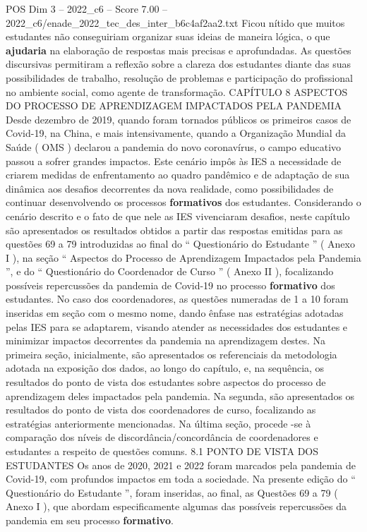 \begin{textsample}{POS Dim 3 – 2022\_c6 – Score 7.00 – 2022\_c6/enade\_2022\_tec\_des\_inter\_b6c4af2aa2.txt}
Ficou nítido que muitos estudantes não conseguiriam organizar suas ideias de maneira lógica, o que \textbf{ajudaria} na elaboração de respostas mais precisas e aprofundadas.
As questões discursivas permitiram a reflexão sobre a clareza dos estudantes diante das suas possibilidades de trabalho, resolução de problemas e participação do profissional no ambiente social, como agente de transformação.
CAPÍTULO 8 ASPECTOS DO PROCESSO DE APRENDIZAGEM IMPACTADOS PELA PANDEMIA Desde dezembro de 2019, quando foram tornados públicos os primeiros casos de Covid-19, na China, e mais intensivamente, quando a Organização Mundial da Saúde ( OMS ) declarou a pandemia do novo coronavírus, o campo educativo passou a sofrer grandes impactos.
Este cenário impôs às IES a necessidade de criarem medidas de enfrentamento ao quadro pandêmico e de adaptação de sua dinâmica aos desafios decorrentes da nova realidade, como possibilidades de continuar desenvolvendo os processos \textbf{formativos} dos estudantes.
Considerando o cenário descrito e o fato de que nele as IES vivenciaram desafios, neste capítulo são apresentados os resultados obtidos a partir das respostas emitidas para as questões 69 a 79 introduzidas ao final do “ Questionário do Estudante ” ( Anexo I ), na seção “ Aspectos do Processo de Aprendizagem Impactados pela Pandemia ”, e do “ Questionário do Coordenador de Curso ” ( Anexo II ), focalizando possíveis repercussões da pandemia de Covid-19 no processo \textbf{formativo} dos estudantes.
No caso dos coordenadores, as questões numeradas de 1 a 10 foram inseridas em seção com o mesmo nome, dando ênfase nas estratégias adotadas pelas IES para se adaptarem, visando atender as necessidades dos estudantes e minimizar impactos decorrentes da pandemia na aprendizagem destes.
Na primeira seção, inicialmente, são apresentados os referenciais da metodologia adotada na exposição dos dados, ao longo do capítulo, e, na sequência, os resultados do ponto de vista dos estudantes sobre aspectos do processo de aprendizagem deles impactados pela pandemia.
Na segunda, são apresentados os resultados do ponto de vista dos coordenadores de curso, focalizando as estratégias anteriormente mencionadas.
Na última seção, procede -se à comparação dos níveis de discordância/concordância de coordenadores e estudantes a respeito de questões comuns. 8.1 PONTO DE VISTA DOS ESTUDANTES Os anos de 2020, 2021 e 2022 foram marcados pela pandemia de Covid-19, com profundos impactos em toda a sociedade.
Na presente edição do “ Questionário do Estudante ”, foram inseridas, ao final, as Questões 69 a 79 ( Anexo I ), que abordam especificamente algumas das possíveis repercussões da pandemia em seu processo \textbf{formativo}.

\end{textsample}
